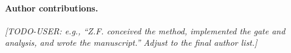 \documentclass[11pt]{article}
\newcommand{\userfill}[1]{\textit{[TODO-USER: #1]}}
\begin{document}
\paragraph{Author contributions.} \userfill{e.g., ``Z.F. conceived the method, implemented the
gate and analysis, and wrote the manuscript.'' Adjust to the final author list.}



\end{document}
